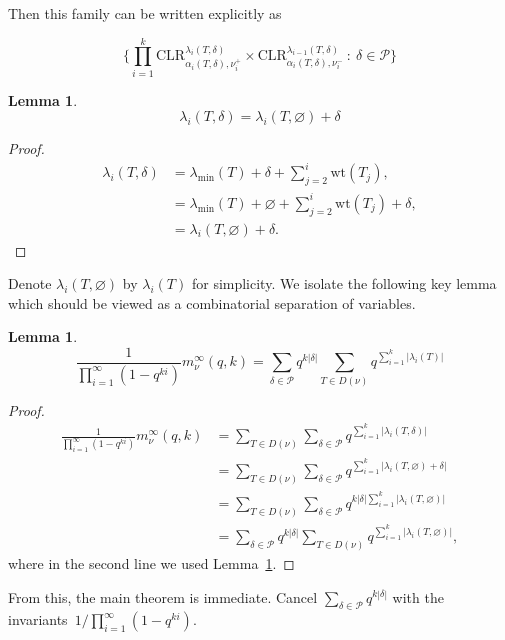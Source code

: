 \documentclass[11pt]{article}
\newtheorem{lemma}[theo]{Lemma}
\theoremstyle{definition}
\numberwithin{equation}{section}
\newcommand{\Par}{\mathcal{P}}
\newcommand{\wt}{\text{wt}}
\newcommand{\CLR}{\text{CLR}}
\begin{document}
Then this family can be written explicitly as 

$$ \{\prod_{i=1}^k \CLR^{\lambda_i(T, \delta)}_{\alpha_i(T, \delta), \nu_i^+} \times \CLR^{\lambda_{i-1}(T,\delta)}_{\alpha_i(T,\delta), \nu_i^-} \ : \  \delta \in \Par \} $$

\begin{lemma} \label{lemma-lambdaiadditive}
    $$\lambda_i(T, \delta) = \lambda_i(T, \varnothing) + \delta$$
\end{lemma}
\begin{proof}
    \begin{align*}
    \lambda_i(T, \delta) &= \lambda_{\min}(T) + \delta + \sum_{j=2}^{i} \wt(T_j),\\
    &= \lambda_{\min}(T) + \varnothing + \sum_{j=2}^{i} \wt(T_j) + \delta,\\
    &= \lambda_i(T, \varnothing) + \delta.
    \end{align*}
\end{proof}

Denote $\lambda_i(T, \varnothing)$ by $\lambda_i(T)$ for simplicity. We isolate the following key lemma which should be viewed as a combinatorial separation of variables. 

\begin{lemma}
    $$\frac{1}{\prod_{i=1}^\infty(1-q^{ki})} m_\nu^\infty(q,k) = \sum_{\delta \in \Par} q^{k|\delta|} \sum_{T \in D(\nu)} q^{\sum_{i=1}^k |\lambda_i(T)|}$$
\end{lemma}

\begin{proof}

    \begin{align*}
    \frac{1}{\prod_{i=1}^\infty(1-q^{ki})}m_\nu^\infty(q,k) &= \sum_{T \in D(\nu)} \sum_{\delta \in \Par} q^{\sum_{i=1}^k |\lambda_i(T, \delta)|}\\
    &= \sum_{T \in D(\nu)} \sum_{\delta \in \Par} q^{\sum_{i=1}^k |\lambda_i(T, \varnothing) + \delta|}\\
    &= \sum_{T \in D(\nu)} \sum_{\delta \in \Par} q^{k|\delta|\sum_{i=1}^k |\lambda_i(T, \varnothing)|}\\
    &= \sum_{\delta \in \Par} q^{k|\delta|} \sum_{T \in D(\nu)} q^{\sum_{i=1}^k |\lambda_i(T, \varnothing)|},
    \end{align*}
    where in the second line we used Lemma~\ref{lemma-lambdaiadditive}.
\end{proof}

From this, the main theorem is immediate. Cancel $\sum_{\delta \in \Par} q^{k|\delta|}$ with the invariants~$1/\prod_{i=1}^\infty(1-q^{ki})$.
\end{document}
